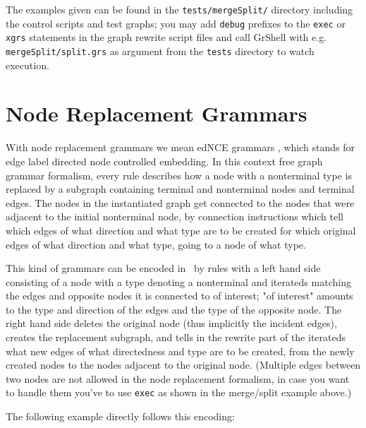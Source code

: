 The examples given can be found in the \texttt{tests/mergeSplit/} directory including the control scripts and test graphs; you may add \texttt{debug} prefixes to the \texttt{exec} or \texttt{xgrs} statements in the graph rewrite script files and call GrShell with e.g. \texttt{mergeSplit/split.grs} as argument from the \texttt{tests} directory to watch execution.


\section{Node Replacement Grammars}
With node replacement grammars we mean edNCE grammars \cite{NodeReplacement}, which stands for edge label directed node controlled embedding. In this context free graph grammar formalism, every rule describes how a node with a nonterminal type is replaced by a subgraph containing terminal and nonterminal nodes and terminal edges. The nodes in the instantiated graph get connected to the nodes that were adjacent to the initial nonterminal node, by connection instructions which tell which edges of what direction and what type are to be created for which original edges of what direction and what type, going to a node of what type.

This kind of grammars can be encoded in \GrG~by rules with a left hand side consisting of a node with a type denoting a nonterminal and iterateds matching the edges and opposite nodes it is connected to of interest; "of interest" amounts to the type and direction of the edges and the type of the opposite node. The right hand side deletes the original node (thus implicitly the incident edges), creates the replacement subgraph, and tells in the rewrite part of the iterateds what new edges of what directedness and type are to be created, from the newly created nodes to the nodes adjacent to the original node. (Multiple edges between two nodes are not allowed in the node replacement formalism, in case you want to handle them you've to use \texttt{exec} as shown in the merge/split example above.)

The following example directly follows this encoding:

